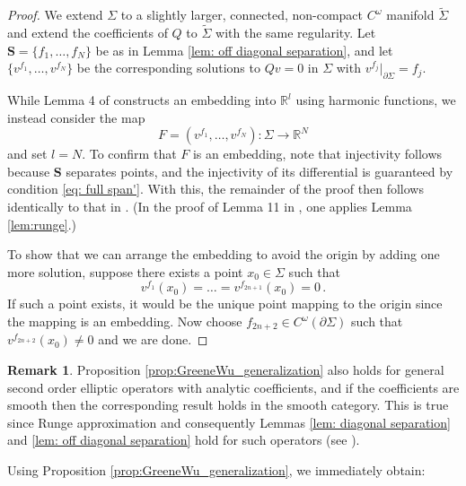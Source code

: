 \documentclass[11pt]{amsart}
\theoremstyle{definition}
\newtheorem{Remark}[Theorem]{Remark}
\numberwithin{equation}{section}
\newcommand{\p}{\partial}
\newcommand{\SSS}{\mathbf S}
\begin{document}
\begin{proof}
We extend $\Sigma$ to a slightly larger, connected, non-compact $C^\omega$ manifold $\widetilde{\Sigma}$ and extend the coefficients of $Q$ to $\widetilde{\Sigma}$ with the same regularity. Let $\SSS = \{f_1, \dots, f_N\}$ be as in Lemma \ref{lem: off diagonal separation}, and let $\{v^{f_1}, \dots, v^{f_N}\}$ be the corresponding solutions to $Qv=0$ in $\Sigma$ with $v^{f_j}|_{\p \Sigma} = f_j$.

While Lemma 4 of \cite{greene1975embedding} constructs an embedding into $\mathbb{R}^l$ using harmonic functions,  we instead consider the map
\[
F = (v^{f_1}, \ldots, v^{f_N}): \Sigma \to \mathbb{R}^N
\]
and set $l=N$. To confirm that $F$ is an embedding, note that injectivity follows because $\SSS$ separates points, and the injectivity of its differential is guaranteed by condition \eqref{eq: full span'}. With this, the remainder of the proof then follows identically to that in \cite{greene1975embedding}.  (In the proof of Lemma 11 in \cite{greene1975embedding}, one applies Lemma \ref{lem:runge}.)  %

To show that we can arrange the embedding to avoid the origin by adding one more solution, suppose there exists a point $x_0\in \Sigma$ such that 
$$v^{f_1} (x_0) = \dots = v^{f_{2n+1}}(x_0) = 0\,.$$
If such a point exists, it would be the unique point mapping to the origin since the mapping is an embedding. Now choose $f_{2n+2}\in C^\omega(\partial \Sigma)$ such that $v^{f_{2n+2}}(x_0) \neq 0$ and we are done.
\end{proof}

\begin{Remark}
Proposition \ref{prop:GreeneWu_generalization} also holds for general second order elliptic operators with analytic coefficients, and if the coefficients are smooth then the corresponding result holds in the smooth category. This is true since Runge approximation and consequently Lemmas \ref{lem: diagonal separation} and \ref{lem: off diagonal separation} hold for such operators (see \cite[Proposition A.7]{LLS}).
\end{Remark}

Using Proposition \ref{prop:GreeneWu_generalization}, we immediately obtain:
\end{document}
